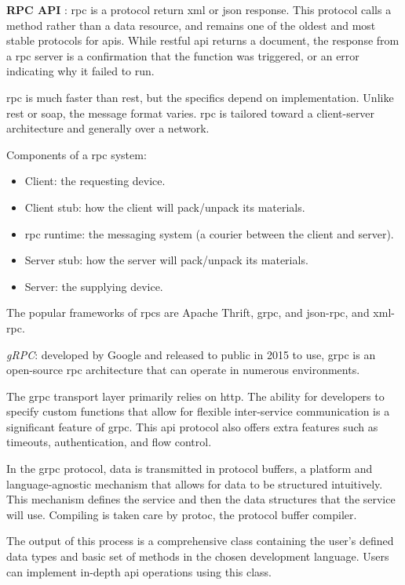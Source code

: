 \begin{multicols}{2} %
      \textbf{RPC API} : \acrshort{rpc} is a protocol return \acrshort{xml} or \acrshort{json} response. This protocol
      calls a method rather than a data resource, and remains one of the oldest and most stable protocols for
      \acrshort{api}s. While \acrshort{rest}ful \acrshort{api} returns a document, the response from a \acrshort{rpc}
      server is a confirmation that the function was triggered, or an error indicating  why it failed to run.

      \acrshort{rpc} is much faster than \acrshort{rest}, but the specifics depend on implementation. Unlike
      \acrshort{rest} or \acrshort{soap}, the message format varies. \acrshort{rpc} is tailored toward a client-server
      architecture and generally over a network.

      Components of a \acrshort{rpc} system:
      \begin{itemize}[label=$\star$]
            \item Client: the requesting device.
            \item Client stub: how the client will pack/unpack its materials.
            \item \acrshort{rpc} runtime: the messaging system (a courier between the client and server).
            \item Server stub: how the server will pack/unpack its materials.
            \item Server: the supplying device.
      \end{itemize}

      The popular frameworks of \acrshort{rpc}s are Apache Thrift, \acrshort{grpc}, and \acrshort{json}-\acrshort{rpc},
      and \acrshort{xml}-\acrshort{rpc}.

      \textit{gRPC}: developed by Google and released to public in 2015 to use, \acrshort{grpc} is an open-source
      \acrshort{rpc} architecture that can operate in numerous environments.

      The \acrshort{grpc} transport layer primarily relies on \acrshort{http}. The ability for developers to specify
      custom functions that allow for flexible inter-service communication is a significant feature of \acrshort{grpc}.
      This \acrshort{api} protocol also offers extra features such as timeouts, authentication, and flow control.

      In the \acrshort{grpc} protocol, data is transmitted in protocol buffers, a platform and language-agnostic mechanism
      that allows for data to be structured intuitively. This mechanism defines the service and then the data structures
      that the service will use. Compiling is taken care by protoc, the protocol buffer compiler.

      The output of this process is a comprehensive class containing the user's defined data types and basic set of methods
      in the chosen development language. Users can implement in-depth \acrshort{api} operations using this class.
\end{multicols}

